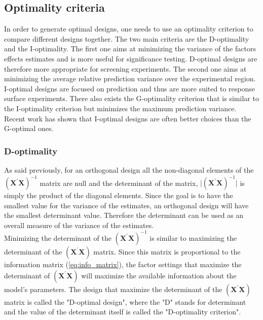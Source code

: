 \subsection{Optimality criteria}
In order to generate optimal designs, one needs to use an optimality criterion to compare different designs together. The two main criteria are the D-optimality and the I-optimality. The first one aims at minimizing the variance of the factors effects estimates and is more useful for significance testing. D-optimal designs are therefore more appropriate for screening experiments. The second one aims at minimizing the average relative prediction variance over the experimental region. I-optimal designs are focused on prediction and thus are more suited to response surface experiments.
There also exists the G-optimality criterion that is similar to the I-optimality criterion but minimizes the maximum prediction variance. Recent work \parencite{rodriguez2010generating} has shown that I-optimal designs are often better choices than the G-optimal ones.
\subsubsection{D-optimality}
As said previously, for an orthogonal design all the non-diagonal elements of the $(\mathbf{X}^{\prime}\mathbf{X})^{-1}$ matrix are null and the determinant of the matrix, $\vert(\mathbf{X}^{\prime}\mathbf{X})^{-1}\vert$ is simply the product of the diagonal elements. Since the goal is to have the smallest value for the variance of the estimates, an orthogonal design will have the smallest determinant value. Therefore the determinant can be used as an overall measure of the variance of the estimates.\\
Minimizing the determinant of the $(\mathbf{X}^{\prime}\mathbf{X})^{-1}$ is similar to maximizing the determinant of the $(\mathbf{X}^{\prime}\mathbf{X})$ matrix. Since this matrix is proportional to the information matrix (\ref{eq:info_matrix}), the factor settings that maximize the determinant of $(\mathbf{X}^{\prime}\mathbf{X})$ will maximize the available information about the model's parameters. The design that maximize the determinant of the $(\mathbf{X}^{\prime}\mathbf{X})$ matrix is called the "D-optimal design", where the "D" stands for determinant and the value of the determinant itself is called the "D-optimality criterion".\\

